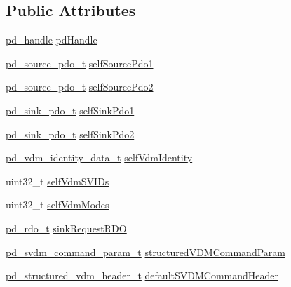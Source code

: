 \subsection*{Public Attributes}
\begin{DoxyCompactItemize}
\item 
\hyperlink{group__usb__pd__stack_ga9397835347d48ef48b6b0ecba6312213}{pd\-\_\-handle} \hyperlink{struct__pd__app_a604cb18a01edb2da262e6d53fe41b70e}{pd\-Handle}
\item 
\hyperlink{group__usb__pd__stack_gae3adfd5239231ab405b04bef0ae1df5a}{pd\-\_\-source\-\_\-pdo\-\_\-t} \hyperlink{struct__pd__app_ad908e0fab5fa09248c7412253ce41095}{self\-Source\-Pdo1}
\item 
\hyperlink{group__usb__pd__stack_gae3adfd5239231ab405b04bef0ae1df5a}{pd\-\_\-source\-\_\-pdo\-\_\-t} \hyperlink{struct__pd__app_a49087b316d085ddf2be9d4ab093a0088}{self\-Source\-Pdo2}
\item 
\hyperlink{group__usb__pd__stack_gaf835814fe2dcf1f17e9e0c58bc74b6ba}{pd\-\_\-sink\-\_\-pdo\-\_\-t} \hyperlink{struct__pd__app_a7e5149d6cb2c98b3193c34c766e41cfb}{self\-Sink\-Pdo1}
\item 
\hyperlink{group__usb__pd__stack_gaf835814fe2dcf1f17e9e0c58bc74b6ba}{pd\-\_\-sink\-\_\-pdo\-\_\-t} \hyperlink{struct__pd__app_ae66313fc794d1247c12b2f9df61c740b}{self\-Sink\-Pdo2}
\item 
\hyperlink{pd__app_8h_ab9dfa9c9b90392b1b3cc1bff4b08e4e9}{pd\-\_\-vdm\-\_\-identity\-\_\-data\-\_\-t} \hyperlink{struct__pd__app_a9ed2335d20ff0eb86b07dc8770d2b6a7}{self\-Vdm\-Identity}
\item 
uint32\-\_\-t \hyperlink{struct__pd__app_a11745e09255efcf04a755844a8f7dc4c}{self\-Vdm\-S\-V\-I\-Ds}
\item 
uint32\-\_\-t \hyperlink{struct__pd__app_afc00e2e0f839a534a57c6cd5d8154b34}{self\-Vdm\-Modes}
\item 
\hyperlink{group__usb__pd__stack_ga4dcb1103574222cf94d4b45128f2b884}{pd\-\_\-rdo\-\_\-t} \hyperlink{struct__pd__app_ab41fa9c76e29ce689c812cfc7ad55150}{sink\-Request\-R\-D\-O}
\item 
\hyperlink{group__usb__pd__stack_gacedc4a601815782eff03211731ea2c7a}{pd\-\_\-svdm\-\_\-command\-\_\-param\-\_\-t} \hyperlink{struct__pd__app_afd1d474adb3bfefdb1ca2a55d36a6428}{structured\-V\-D\-M\-Command\-Param}
\item 
\hyperlink{group__usb__pd__stack_ga245b8bec3f3b7771e73016ac98595570}{pd\-\_\-structured\-\_\-vdm\-\_\-header\-\_\-t} \hyperlink{struct__pd__app_ae2637382e9ae847b799c8b6e0dd1f290}{default\-S\-V\-D\-M\-Command\-Header}

\end{DoxyCompactItemize}
